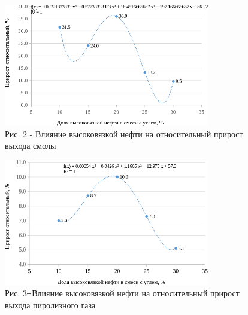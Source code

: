 \begin{figure}[H]
	\centering
	\includegraphics[width=0.8\textwidth]{media/chem/image114}
	\caption*{Рис. 2 - Влияние высоковязкой нефти на относительный прирост
выхода смолы}
\end{figure}

\begin{figure}[H]
	\centering
	\includegraphics[width=0.8\textwidth]{media/chem/image115}
	\caption*{Рис. 3 ̶ Влияние высоковязкой нефти на относительный прирост
выхода пиролизного газа}
\end{figure}


